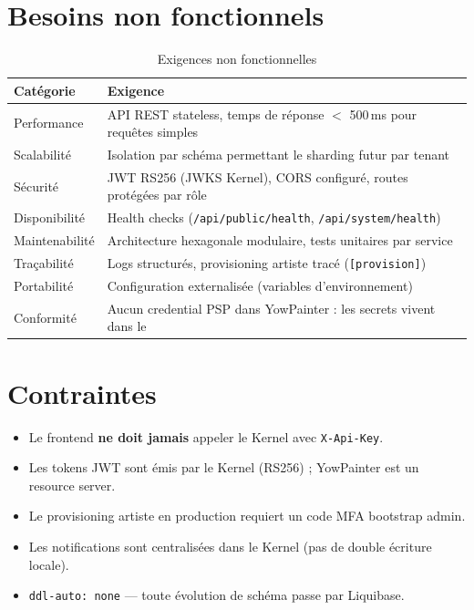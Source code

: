 \section{Besoins non fonctionnels}

\begin{table}[h]
  \centering
  \caption{Exigences non fonctionnelles}
  \label{tab:bnf}
  \begin{tabular}{@{}p{3.5cm}p{10cm}@{}}
    \toprule
    \textbf{Catégorie} & \textbf{Exigence} \\
    \midrule
    Performance       & API REST stateless, temps de réponse $<$ 500\,ms pour requêtes simples \\
    Scalabilité       & Isolation par schéma permettant le sharding futur par tenant \\
    Sécurité          & JWT RS256 (JWKS Kernel), CORS configuré, routes protégées par rôle \\
    Disponibilité     & Health checks (\texttt{/api/public/health}, \texttt{/api/system/health}) \\
    Maintenabilité    & Architecture hexagonale modulaire, tests unitaires par service \\
    Traçabilité       & Logs structurés, provisioning artiste tracé (\texttt{[provision]}) \\
    Portabilité       & Configuration externalisée (variables d'environnement) \\
    Conformité        & Aucun credential PSP dans YowPainter : les secrets vivent dans le  \\
    \bottomrule
  \end{tabular}
\end{table}

\section{Contraintes}

\begin{itemize}[noitemsep]
  \item Le frontend \textbf{ne doit jamais} appeler le Kernel avec \texttt{X-Api-Key}.
  \item Les tokens JWT sont émis par le Kernel (RS256) ; YowPainter est un resource server.
  \item Le provisioning artiste en production requiert un code MFA bootstrap admin.
  \item Les notifications sont centralisées dans le Kernel (pas de double écriture locale).
  \item \texttt{ddl-auto: none} — toute évolution de schéma passe par Liquibase.
\end{itemize}

